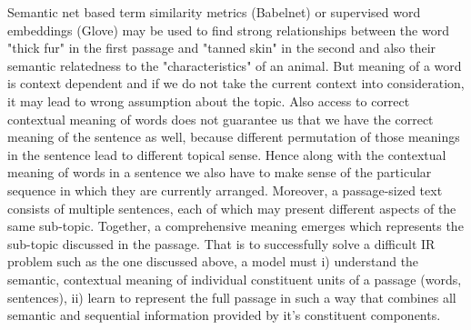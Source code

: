 \documentclass[sigconf,authordraft]{acmart}
\begin{document}
Semantic net based term similarity metrics (Babelnet) or supervised word embeddings (Glove) may be used to find strong relationships between the word "thick fur" in the first passage and "tanned skin" in the second and also their semantic relatedness to the "characteristics" of an animal. But meaning of a word is context dependent and if we do not take the current context into consideration, it may lead to wrong assumption about the topic. Also access to correct contextual meaning of words does not guarantee us that we have the correct meaning of the sentence as well, because different permutation of those meanings in the sentence lead to different topical sense. Hence along with the contextual meaning of words in a sentence we also have to make sense of the particular sequence in which they are currently arranged. Moreover, a passage-sized text consists of multiple sentences, each of which may present different aspects of the same sub-topic. Together, a comprehensive meaning emerges which represents the sub-topic discussed in the passage. That is to successfully solve a difficult IR problem such as the one discussed above, a model must i) understand the semantic, contextual meaning of individual constituent units of a passage (words, sentences), ii) learn to represent the full passage in such a way that combines all semantic and sequential information provided by it's constituent components.
\end{document}
